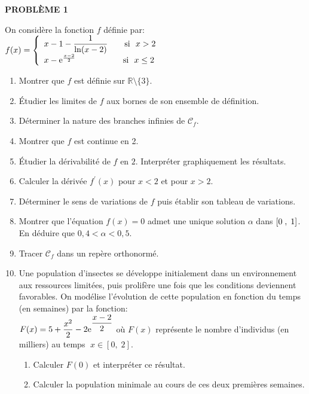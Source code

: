 



 
	
\textbf{PROBLÈME 1} 



On considère la fonction $ f $ définie   par:\\    $f(x)=\left \{\begin{array}{l} x-1-\dfrac{1}{\ln(x-2)}~~~~~~ \textrm{si}~~ x> 2  \\ x-\mathrm{e}^{\frac{x-2}{2}}\hspace{2cm}\textrm{si}~~ x\leq 2 ~\end{array}\right.$

 \begin{enumerate}
\item Montrer que   $ f $ est définie sur $ \mathbb{R}\setminus\{3\} $.
\item Étudier les limites de $ f $ aux bornes de son ensemble de définition.
\item Déterminer la nature des branches infinies de  $\mathscr{C}_{f}$.
\item  Montrer que $ f $ est continue en 2.
\item Étudier la   dérivabilité de $ f $  en $ 2 $. Interpréter graphiquement les résultats.
\item Calculer la dérivée $ f^{\prime} (x)$ pour $x<2$  et pour $ x> 2$.
\item Déterminer le sens de variations de $ f $ puis établir  son tableau de  variations. 
\item Montrer que l'équation  $ f(x)=0 $  admet une unique solution $ \alpha $ dans $ \left[0\;,\; 1\right] $. En déduire que $ 0,4< \alpha<0,5 $.
\item Tracer $\mathscr{C}_{f}$   dans un  repère orthonormé.
\item Une population d'insectes se développe initialement dans un environnement aux ressources limitées, puis prolifère une fois que les conditions deviennent favorables. On modélise l'évolution de cette population en fonction du temps (en semaines) par la fonction:\\ $ F(x)= 5+\dfrac{x^{2}}{2}-2\mathrm{e}^{\dfrac{x-2}{2}} $  
où \( F(x) \) représente le nombre d'individus (en milliers) au temps $\; x\in[0,\; 2]$.

\begin{enumerate}
        \item Calculer \( F(0) \) et interpréter ce résultat.       
        \item Calculer la population minimale au cours de  ces deux premières semaines.
  

\end{enumerate}
\end{enumerate}
